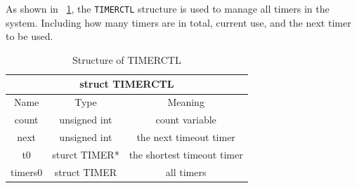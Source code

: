 \documentclass{swfcthesis}
\begin{document}
As shown in ~\ref{tab:TIMERCTL}, the \texttt{TIMERCTL} structure is used to manage all
timers in the system. Including how many timers are in total, current use, and the next
timer to be used.

\begin{table}[!htbp]
  \centering
  \begin{tabular}{|c|c|c|}
    \hline
    \multicolumn{3}{|c|}{struct TIMERCTL} \\
    \hline
    Name & Type & Meaning \\
    \hline
    count & unsigned int & count variable \\
    \hline
    next & unsigned int & the next timeout timer \\
    \hline
    t0 & sturct TIMER* & the shortest timeout timer \\
    \hline
    timers0 & struct TIMER & all timers \\
    \hline
  \end{tabular}
  \caption{Structure of TIMERCTL}
  \label{tab:TIMERCTL}
\end{table}
\end{document}
